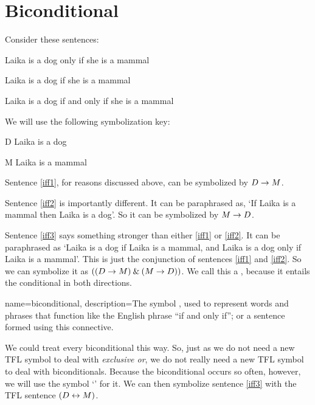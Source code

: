 \section{Biconditional}
Consider these sentences:
	\begin{earg}
		\item[\ex{iff1}] Laika is a dog only if she is a mammal
		\item[\ex{iff2}] Laika is a dog if she is a mammal
		\item[\ex{iff3}] Laika is a dog if and only if she is a mammal
	\end{earg}
We will use the following symbolization key:
	\begin{ekey}
		\item[D] Laika is a dog
		\item[M] Laika is a mammal
	\end{ekey}
Sentence \ref{iff1}, for reasons discussed above, can be symbolized by $D \rightarrow M$.

Sentence \ref{iff2} is importantly different. It can be paraphrased as, `If Laika is a mammal then Laika is a dog'. So it can be symbolized by $M \rightarrow D$.

Sentence \ref{iff3} says something stronger than either \ref{iff1} or \ref{iff2}. It can be paraphrased as `Laika is a dog if Laika is a mammal, and Laika is a dog only if Laika is a mammal'. This is just the conjunction of sentences \ref{iff1} and \ref{iff2}. So we can symbolize it as $((D \rightarrow M) \mathbin{\&} (M \rightarrow D))$. We call this a , because it entails the conditional in both directions. 

{
name=biconditional,
description={The symbol \eiff, used to represent words and phrases that function like the English phrase ``if and only if''; or a sentence formed using this connective.}
}

We could treat every biconditional this way. So, just as we do not need a new TFL symbol to deal with \emph{exclusive or}, we do not really need a new TFL symbol to deal with biconditionals. Because the biconditional occurs so often, however, we will use the symbol `\eiff' for it. We can then symbolize sentence \ref{iff3} with the TFL sentence $(D \leftrightarrow M)$. 

